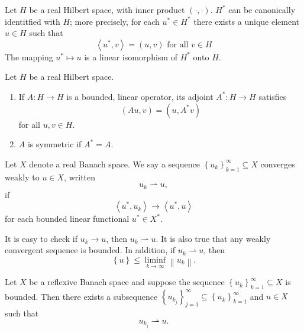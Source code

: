 \begin{theorem}
  \label{theorem-Riesz-representation-theorem}
  Let \( H \) be a real Hilbert space, with inner product \( (\cdot, \cdot) \).
  \( H^* \) can be canonically identitfied with \( H \);
  more precisely, for each \( u^* \in H^* \) there exists a unique element \( u \in H \) such that
  \[
    \left\langle u^*, v \right\rangle = (u, v) \text{ for all } v \in H
  \]
  The mapping \( u^* \mapsto u \) is a linear isomorphism of \( H^* \) onto \( H \).
\end{theorem}

\begin{definition}
  \label{definition-adjoint-operator}
  \label{definition-symmetric-operator}
  Let \( H \) be a real Hilbert space.
  \begin{enumerate}
    \item If \( A: H \to H \) is a bounded, linear operator, its adjoint \( A^*: H \to H \) satisfies
          \[
            (Au, v) = (u, A^* v)
          \]
          for all \( u, v \in H \).
    \item \( A \) is symmetric if \( A^* = A \).
  \end{enumerate}
\end{definition}

\begin{definition}
  \label{definition-converge-weakly}
  Let \( X \) denote a real Banach space.
  We say a sequence \( \left\lbrace u_k \right\rbrace_{k = 1}^{\infty} \subseteq X \) converges weakly to \( u \in X \), written
  \[
    u_k \rightharpoonup u,
  \]
  if
  \[
    \left\langle u^*, u_k \right\rangle \to \left\langle u^*, u \right\rangle
  \]
  for each bounded linear functional \( u^* \in X^* \).
\end{definition}

It is easy to check if \( u_k \to u \), then \( u_k \rightharpoonup u  \).
It is also true that any weakly convergent sequence is bounded.
In addition, if \( u_k \rightharpoonup u \), then
\[
  \left\lbrace u \right\rbrace \leq \liminf_{k \to \infty} \left\lVert u_k \right\rVert.
\]
\begin{theorem}
  \label{theorem-weak-compactness}
  Let \( X \) be a reflexive Banach space and suppose the sequence \( \left\lbrace u_k \right\rbrace_{k = 1}^\infty \subseteq X \) is bounded.
  Then there exists a subsequence \( \left\lbrace u_{k_j} \right\rbrace^{\infty}_{j = 1} \subseteq \left\lbrace u_k \right\rbrace_{k = 1}^{\infty} \) and \( u \in X \) such that
  \[
    u_{k_j} \rightharpoonup u.
  \]
\end{theorem}

